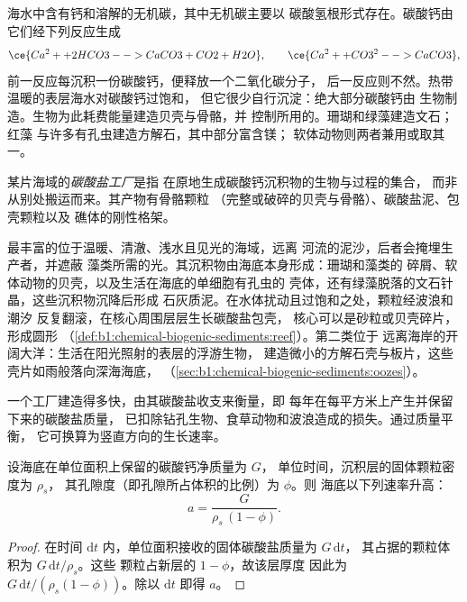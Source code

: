 海水中含有钙和溶解的无机碳，其中无机碳主要以
碳酸氢根形式存在。碳酸钙由它们经下列反应生成
\[
\ce{Ca^2+ + 2 HCO3- -> CaCO3 + CO2 + H2O}, \qquad
\ce{Ca^2+ + CO3^2- -> CaCO3},
\]
前一反应每沉积一份碳酸钙，便释放一个二氧化碳分子，
后一反应则不然。热带温暖的表层海水对碳酸钙过饱和，
但它很少自行沉淀：绝大部分碳酸钙由
生物制造。生物为此耗费能量建造贝壳与骨骼，并
控制所用的。珊瑚和绿藻建造文石；红藻
与许多有孔虫建造方解石，其中部分富含镁；
软体动物则两者兼用或取其一。

\begin{definition}[碳酸盐工厂]\label{def:b1:chemical-biogenic-sediments:factory}
某片海域的\emph{碳酸盐工厂}是指
在原地生成碳酸钙沉积物的生物与过程的集合，
而非从别处搬运而来。其产物有骨骼颗粒
（完整或破碎的贝壳与骨骼）、碳酸盐泥、包壳颗粒以及
礁体的刚性格架。
\end{definition}

最丰富的位于温暖、清澈、浅水且见光的海域，远离
河流的泥沙，后者会掩埋生产者，并遮蔽
藻类所需的光。其沉积物由海底本身形成：珊瑚和藻类的
碎屑、软体动物的贝壳，以及生活在海底的单细胞有孔虫的
壳体，还有绿藻脱落的文石针晶，这些沉积物沉降后形成
石灰质泥。在水体扰动且过饱和之处，颗粒经波浪和潮汐
反复翻滚，在核心周围层层生长碳酸盐包壳，
核心可以是砂粒或贝壳碎片，形成圆形
（\cref{def:b1:chemical-biogenic-sediments:reef}）。第二类位于
远离海岸的开阔大洋：生活在阳光照射的表层的浮游生物，
建造微小的方解石壳与板片，这些壳片如雨般落向深海海底，
（\cref{sec:b1:chemical-biogenic-sediments:oozes}）。

一个工厂建造得多快，由其碳酸盐收支来衡量，即
每年在每平方米上产生并保留下来的碳酸盐质量，
已扣除钻孔生物、食草动物和波浪造成的损失。通过质量平衡，
它可换算为竖直方向的生长速率。

\begin{proposition}[由碳酸盐收支得到的堆积]\label{prop:b1:chemical-biogenic-sediments:accretion}
设海底在单位面积上保留的碳酸钙净质量为 $G$，
单位时间，沉积层的固体颗粒密度为 $\rho_s$，
其孔隙度（即孔隙所占体积的比例）为 $\phi$。则
海底以下列速率升高：
\[
a = \frac{G}{\rho_s\,(1-\phi)}.
\]
\end{proposition}

\begin{proof}
在时间 $\mathrm dt$ 内，单位面积接收的固体碳酸盐质量为 $G\,\mathrm dt$，
其占据的颗粒体积为 $G\,\mathrm dt/\rho_s$。这些
颗粒占新层的 $1-\phi$，故该层厚度
因此为 $G\,\mathrm dt/(\rho_s(1-\phi))$。除以 $\mathrm dt$ 即得 $a$。
\end{proof}

